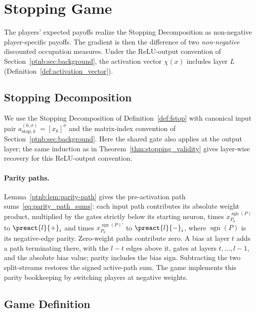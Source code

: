 \section{Stopping Game}\label{ptnb:app:relu-net-game}\label{ptnb:app:adf-game}\label{ptnb:sec:stopping}\label{sec:stopping_game_reinterpretation}

The players' expected payoffs realize the Stopping Decomposition as non-negative player-specific payoffs. The gradient is then the
difference of two \emph{non-negative} discounted occupation measures. Under the
ReLU-output convention of Section~\ref{ptnb:sec:background}, the activation vector $\chi(x)$ includes layer $L$ (Definition~\ref{def:activation_vector}).

\subsection{Stopping Decomposition}\label{ptnb:app:dc-decomp}\label{ptnb:app:decompositions}

We use the Stopping Decomposition of Definition~\ref{def:fstop} with canonical input pair $a_{\mathrm{stop},k}^{(0,\sigma)}=[x_k]^\sigma$ and the matrix-index convention of Section~\ref{ptnb:sec:background}. Here the shared gate also applies at the output layer; the same induction as in Theorem~\ref{thm:stopping_validity} gives layer-wise recovery for this ReLU-output convention.

\paragraph{Parity paths.}\label{ptnb:app:parity-path}
Lemma~\ref{ptnb:lem:parity-path} gives the pre-activation path sums~\eqref{eq:parity_path_sums}: each input path
contributes its absolute weight product, multiplied by the gates strictly below its starting
neuron, times $x^{\operatorname{sgn}(P)}_{P_0}$ to $\preact{l}{+}_i$ and times $x^{\operatorname{sgn}(P)'}_{P_0}$ to $\preact{l}{-}_i$, where $\operatorname{sgn}(P)$ is its negative-edge parity. Zero-weight paths contribute zero.
A bias at layer $t$ adds a path terminating there, with the $l-t$ edges above it, gates at
layers $t,\dots,l-1$, and the absolute bias value; parity includes the bias sign. Subtracting the two split-streams restores the signed active-path
sum. The game implements this parity bookkeeping by switching players at negative weights.

\subsection{Game Definition}\label{ptnb:app:adf-game-def}\label{sec:shapley_bellman_recursion}\label{ptnb:app:adf-recursion}

